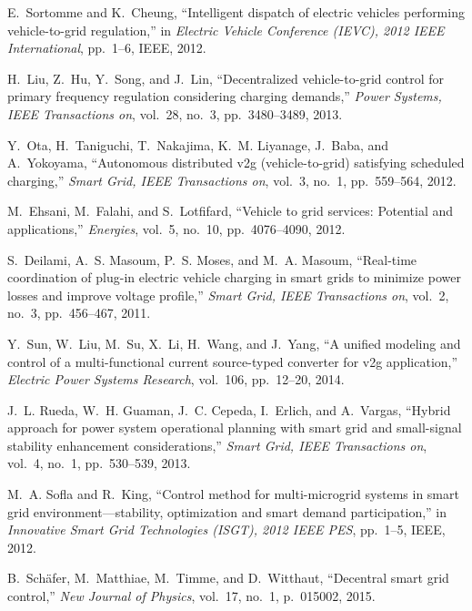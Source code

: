 \documentclass[final,12pt]{elsarticle}
\begin{document}
\begin{thebibliography}{10}
E.~Sortomme and K.~Cheung, ``Intelligent dispatch of electric vehicles
  performing vehicle-to-grid regulation,'' in {\em Electric Vehicle Conference
  (IEVC), 2012 IEEE International}, pp.~1--6, IEEE, 2012.

H.~Liu, Z.~Hu, Y.~Song, and J.~Lin, ``Decentralized vehicle-to-grid control for
  primary frequency regulation considering charging demands,'' {\em Power
  Systems, IEEE Transactions on}, vol.~28, no.~3, pp.~3480--3489, 2013.

Y.~Ota, H.~Taniguchi, T.~Nakajima, K.~M. Liyanage, J.~Baba, and A.~Yokoyama,
  ``Autonomous distributed v2g (vehicle-to-grid) satisfying scheduled
  charging,'' {\em Smart Grid, IEEE Transactions on}, vol.~3, no.~1,
  pp.~559--564, 2012.

M.~Ehsani, M.~Falahi, and S.~Lotfifard, ``Vehicle to grid services: Potential
  and applications,'' {\em Energies}, vol.~5, no.~10, pp.~4076--4090, 2012.

S.~Deilami, A.~S. Masoum, P.~S. Moses, and M.~A. Masoum, ``Real-time
  coordination of plug-in electric vehicle charging in smart grids to minimize
  power losses and improve voltage profile,'' {\em Smart Grid, IEEE
  Transactions on}, vol.~2, no.~3, pp.~456--467, 2011.

Y.~Sun, W.~Liu, M.~Su, X.~Li, H.~Wang, and J.~Yang, ``A unified modeling and
  control of a multi-functional current source-typed converter for v2g
  application,'' {\em Electric Power Systems Research}, vol.~106, pp.~12--20,
  2014.

J.~L. Rueda, W.~H. Guaman, J.~C. Cepeda, I.~Erlich, and A.~Vargas, ``Hybrid
  approach for power system operational planning with smart grid and
  small-signal stability enhancement considerations,'' {\em Smart Grid, IEEE
  Transactions on}, vol.~4, no.~1, pp.~530--539, 2013.

M.~A. Sofla and R.~King, ``Control method for multi-microgrid systems in smart
  grid environment—stability, optimization and smart demand participation,''
  in {\em Innovative Smart Grid Technologies (ISGT), 2012 IEEE PES}, pp.~1--5,
  IEEE, 2012.

B.~Sch{\"a}fer, M.~Matthiae, M.~Timme, and D.~Witthaut, ``Decentral smart grid
  control,'' {\em New Journal of Physics}, vol.~17, no.~1, p.~015002, 2015.


\end{thebibliography}
\end{document}
